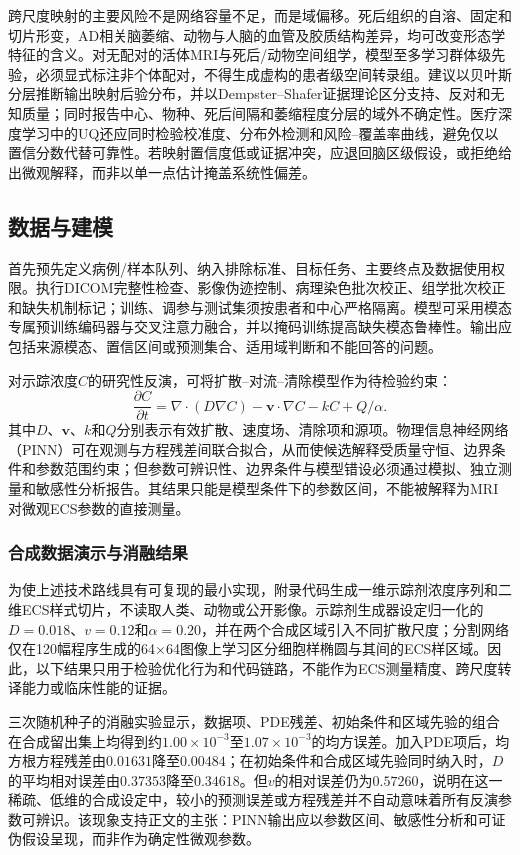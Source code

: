 ﻿\documentclass[11pt,a4paper]{article}
\begin{document}
跨尺度映射的主要风险不是网络容量不足，而是域偏移。死后组织的自溶、固定和切片形变，AD相关脑萎缩、动物与人脑的血管及胶质结构差异，均可改变形态学特征的含义。对无配对的活体MRI与死后/动物空间组学，模型至多学习群体级先验，必须显式标注非个体配对，不得生成虚构的患者级空间转录组。建议以贝叶斯分层推断输出映射后验分布，并以Dempster--Shafer证据理论区分支持、反对和无知质量\cite{shafer1976}；同时报告中心、物种、死后间隔和萎缩程度分层的域外不确定性。医疗深度学习中的UQ还应同时检验校准度、分布外检测和风险--覆盖率曲线，避免仅以置信分数代替可靠性\cite{gawlikowski2023}。若映射置信度低或证据冲突，应退回脑区级假设，或拒绝给出微观解释，而非以单一点估计掩盖系统性偏差。

\subsection{数据与建模}
首先预先定义病例/样本队列、纳入排除标准、目标任务、主要终点及数据使用权限。执行DICOM完整性检查、影像伪迹控制、病理染色批次校正、组学批次校正和缺失机制标记；训练、调参与测试集须按患者和中心严格隔离。模型可采用模态专属预训练编码器与交叉注意力融合，并以掩码训练提高缺失模态鲁棒性。输出应包括来源模态、置信区间或预测集合、适用域判断和不能回答的问题。

对示踪浓度$C$的研究性反演，可将扩散--对流--清除模型作为待检验约束：
\begin{equation}
\frac{\partial C}{\partial t}=\nabla\cdot(D\nabla C)-\mathbf{v}\cdot\nabla C-kC+Q/\alpha.
\label{eq:pde}
\end{equation}
其中$D$、$\mathbf{v}$、$k$和$Q$分别表示有效扩散、速度场、清除项和源项。物理信息神经网络（PINN）可在观测与方程残差间联合拟合\cite{raissi2019}，从而使候选解释受质量守恒、边界条件和参数范围约束；但参数可辨识性、边界条件与模型错设必须通过模拟、独立测量和敏感性分析报告。其结果只能是模型条件下的参数区间，不能被解释为MRI对微观ECS参数的直接测量。

\subsubsection{合成数据演示与消融结果}
为使上述技术路线具有可复现的最小实现，附录代码生成一维示踪剂浓度序列和二维ECS样式切片，不读取人类、动物或公开影像。示踪剂生成器设定归一化的$D=0.018$、$v=0.12$和$\alpha=0.20$，并在两个合成区域引入不同扩散尺度；分割网络仅在120幅程序生成的64$\times$64图像上学习区分细胞样椭圆与其间的ECS样区域。因此，以下结果只用于检验优化行为和代码链路，不能作为ECS测量精度、跨尺度转译能力或临床性能的证据。

三次随机种子的消融实验显示，数据项、PDE残差、初始条件和区域先验的组合在合成留出集上均得到约$1.00\times10^{-3}$至$1.07\times10^{-3}$的均方误差。加入PDE项后，均方根方程残差由$0.01631$降至$0.00484$；在初始条件和合成区域先验同时纳入时，$D$的平均相对误差由$0.37353$降至$0.34618$。但$v$的相对误差仍为$0.57260$，说明在这一稀疏、低维的合成设定中，较小的预测误差或方程残差并不自动意味着所有反演参数可辨识。该现象支持正文的主张：PINN输出应以参数区间、敏感性分析和可证伪假设呈现，而非作为确定性微观参数。
\end{document}
